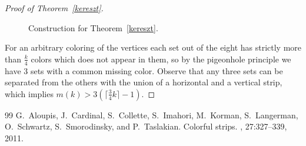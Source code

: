 \documentclass[11pt,oneside]{amsart}
\begin{document}
\begin{proof}[Proof of Theorem~\ref{kereszt}]
\begin{figure}[h!]
\caption{Construction for Theorem~\ref{kereszt}.}
\label{keresztabra}
\end{figure}

For an arbitrary coloring of the vertices each set out of the eight has strictly more than $\frac{k}{4}$ colors which does not appear in them, so by the pigeonhole principle we have 3 sets with a common missing color. Observe that any three sets can be separated from the others with the union of a horizontal and a vertical strip, which implies $m(k)>3(\lceil \frac{3}{4}k\rceil-1)$.
\end{proof}

\begin{thebibliography}{99}
G.~Aloupis, J.~Cardinal, S.~Collette, S.~Imahori, M.~Korman, S.~Langerman,
  O.~Schwartz, S.~Smorodinsky, and P.~Taslakian.
\newblock Colorful strips.
, 27:327--339, 2011.
\end{thebibliography}
\end{document}
